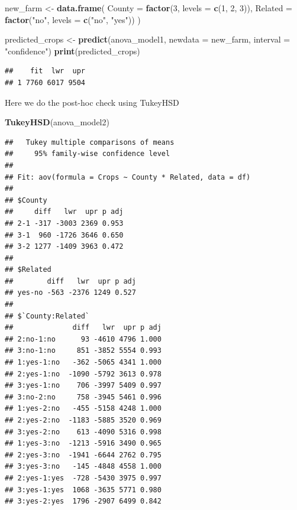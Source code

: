 \documentclass[
]{article}
\newenvironment{Shaded}{\begin{snugshade}}{\end{snugshade}}
\newcommand{\AttributeTok}[1]{\textcolor[rgb]{0.13,0.29,0.53}{#1}}
\newcommand{\DecValTok}[1]{\textcolor[rgb]{0.00,0.00,0.81}{#1}}
\newcommand{\FunctionTok}[1]{\textcolor[rgb]{0.13,0.29,0.53}{\textbf{#1}}}
\newcommand{\NormalTok}[1]{#1}
\newcommand{\OtherTok}[1]{\textcolor[rgb]{0.56,0.35,0.01}{#1}}
\newcommand{\StringTok}[1]{\textcolor[rgb]{0.31,0.60,0.02}{#1}}
\begin{document}
\begin{Shaded}
\begin{Highlighting}[]
\NormalTok{new\_farm }\OtherTok{\textless{}{-}} \FunctionTok{data.frame}\NormalTok{(}
  \AttributeTok{County =} \FunctionTok{factor}\NormalTok{(}\DecValTok{3}\NormalTok{, }\AttributeTok{levels =} \FunctionTok{c}\NormalTok{(}\DecValTok{1}\NormalTok{, }\DecValTok{2}\NormalTok{, }\DecValTok{3}\NormalTok{)), }
  \AttributeTok{Related =} \FunctionTok{factor}\NormalTok{(}\StringTok{"no"}\NormalTok{, }\AttributeTok{levels =} \FunctionTok{c}\NormalTok{(}\StringTok{"no"}\NormalTok{, }\StringTok{"yes"}\NormalTok{))}
\NormalTok{)}

\NormalTok{predicted\_crops }\OtherTok{\textless{}{-}} \FunctionTok{predict}\NormalTok{(anova\_model1, }\AttributeTok{newdata =}\NormalTok{ new\_farm, }\AttributeTok{interval =} \StringTok{"confidence"}\NormalTok{)}
\FunctionTok{print}\NormalTok{(predicted\_crops)}
\end{Highlighting}
\end{Shaded}

\begin{verbatim}
##    fit  lwr  upr
## 1 7760 6017 9504
\end{verbatim}

Here we do the post-hoc check using TukeyHSD

\begin{Shaded}
\begin{Highlighting}[]
\FunctionTok{TukeyHSD}\NormalTok{(anova\_model2)}
\end{Highlighting}
\end{Shaded}

\begin{verbatim}
##   Tukey multiple comparisons of means
##     95% family-wise confidence level
## 
## Fit: aov(formula = Crops ~ County * Related, data = df)
## 
## $County
##     diff   lwr  upr p adj
## 2-1 -317 -3003 2369 0.953
## 3-1  960 -1726 3646 0.650
## 3-2 1277 -1409 3963 0.472
## 
## $Related
##        diff   lwr  upr p adj
## yes-no -563 -2376 1249 0.527
## 
## $`County:Related`
##              diff   lwr  upr p adj
## 2:no-1:no      93 -4610 4796 1.000
## 3:no-1:no     851 -3852 5554 0.993
## 1:yes-1:no   -362 -5065 4341 1.000
## 2:yes-1:no  -1090 -5792 3613 0.978
## 3:yes-1:no    706 -3997 5409 0.997
## 3:no-2:no     758 -3945 5461 0.996
## 1:yes-2:no   -455 -5158 4248 1.000
## 2:yes-2:no  -1183 -5885 3520 0.969
## 3:yes-2:no    613 -4090 5316 0.998
## 1:yes-3:no  -1213 -5916 3490 0.965
## 2:yes-3:no  -1941 -6644 2762 0.795
## 3:yes-3:no   -145 -4848 4558 1.000
## 2:yes-1:yes  -728 -5430 3975 0.997
## 3:yes-1:yes  1068 -3635 5771 0.980
## 3:yes-2:yes  1796 -2907 6499 0.842
\end{verbatim}
\end{document}
